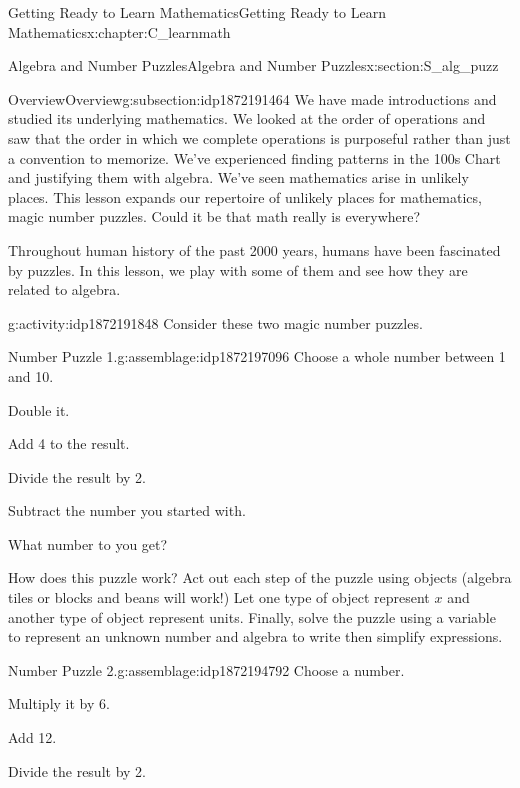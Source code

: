 \documentclass[oneside,10pt,]{book}
\numberwithin{equation}{chapter}
\begin{document}
\begin{chapterptx}{Getting Ready to Learn Mathematics}{}{Getting Ready to Learn Mathematics}{}{}{x:chapter:C_learnmath}
\typeout{************************************************}
%
\begin{sectionptx}{Algebra and Number Puzzles}{}{Algebra and Number Puzzles}{}{}{x:section:S_alg_puzz}
%
%
\typeout{************************************************}
\typeout{************************************************}
%
\begin{subsectionptx}{Overview}{}{Overview}{}{}{g:subsection:idp1872191464}
We have made introductions and studied its underlying mathematics. We looked at the order of operations and saw that the order in which we complete operations is purposeful rather than just a convention to memorize. We've experienced finding patterns in the 100s Chart and justifying them with algebra. We've seen mathematics arise in unlikely places. This lesson expands our repertoire of unlikely places for mathematics, magic number puzzles. Could it be that math really is everywhere?%
\par
Throughout human history of the past 2000 years, humans have been fascinated by puzzles. In this lesson, we play with some of them and see how they are related to algebra.%
\end{subsectionptx}
\begin{activity}{}{g:activity:idp1872191848}%
Consider these two magic number puzzles. \begin{assemblage}{Number Puzzle 1.}{g:assemblage:idp1872197096}%
Choose a whole number between 1 and 10.%
\par
Double it.%
\par
Add 4 to the result.%
\par
Divide the result by 2.%
\par
Subtract the number you started with.%
\par
What number to you get?%
\end{assemblage}
%
\par
How does this puzzle work? Act out each step of the puzzle using objects (algebra tiles or blocks and beans will work!) Let one type of object represent \(x\) and another type of object represent units. Finally, solve the puzzle using a variable to represent an unknown number and algebra to write then simplify expressions. \begin{assemblage}{Number Puzzle 2.}{g:assemblage:idp1872194792}%
Choose a number.%
\par
Multiply it by 6.%
\par
Add 12.%
\par
Divide the result by 2.%

\end{assemblage}
\end{activity}
\end{sectionptx}
\end{chapterptx}
\end{document}
